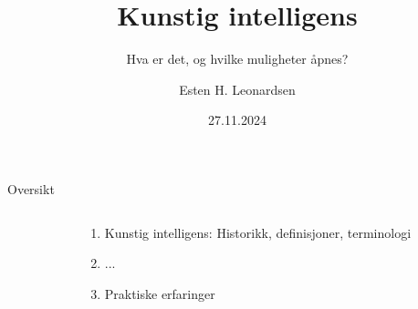 \documentclass{beamer}
\title{Kunstig intelligens}
\subtitle{Hva er det, og hvilke muligheter åpnes?}
\date{27.11.2024}
\author{Esten H. Leonardsen}
\begin{document}
    \begin{frame}
        \titlepage
    \end{frame}

    \begin{frame}{Oversikt}
        \begin{columns}
            \begin{column}{0.25\textwidth}
            \end{column}
            \begin{column}{0.75\textwidth}
                \begin{enumerate}
                    \item Kunstig intelligens: Historikk, definisjoner, terminologi
                    \item ...
                    \item Praktiske erfaringer
                \end{enumerate}
            \end{column}
        \end{columns}
    \end{frame}
\end{document}
